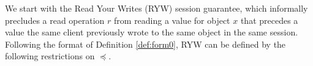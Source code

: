 \documentclass[acmlarge, ,11pt]{acmart}
\begin{document}
We start with the Read Your Writes (RYW) session guarantee, which informally precludes a read operation $r$ from reading a value for object $x$ that precedes a value the same client previously wrote to the same object in the same session.
Following the format of Definition \ref{def:form0}, RYW can be defined by the following restrictions on $\preccurlyeq$.
\end{document}
